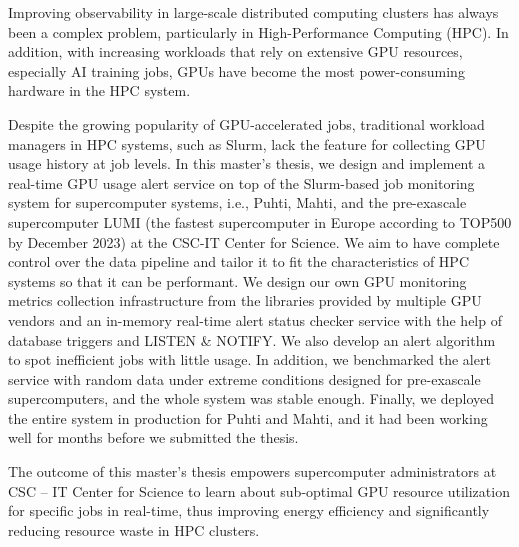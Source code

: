Improving observability in large-scale distributed computing clusters has always been a complex problem, particularly in High-Performance Computing (HPC). In addition, with increasing workloads that rely on extensive GPU resources, especially AI training jobs, GPUs have become the most power-consuming hardware in the HPC system.

Despite the growing popularity of GPU-accelerated jobs, traditional workload managers in HPC systems, such as Slurm, lack the feature for collecting GPU usage history at job levels. In this master's thesis, we design and implement a real-time GPU usage alert service on top of the Slurm-based job monitoring system for supercomputer systems, i.e., Puhti, Mahti, and the pre-exascale supercomputer LUMI (the fastest supercomputer in Europe according to TOP500 by December 2023) at the CSC-IT Center for Science. We aim to have complete control over the data pipeline and tailor it to fit the characteristics of HPC systems so that it can be performant. We design our own GPU monitoring metrics collection infrastructure from the libraries provided by multiple GPU vendors and an in-memory real-time alert status checker service with the help of database triggers and LISTEN \& NOTIFY. We also develop an alert algorithm to spot inefficient jobs with little usage. In addition, we benchmarked the alert service with random data under extreme conditions designed for pre-exascale supercomputers, and the whole system was stable enough. Finally, we deployed the entire system in production for Puhti and Mahti, and it had been working well for months before we submitted the thesis.

The outcome of this master's thesis empowers supercomputer administrators at CSC -- IT Center for Science to learn about sub-optimal GPU resource utilization for specific jobs in real-time, thus improving energy efficiency and significantly reducing resource waste in HPC clusters.
